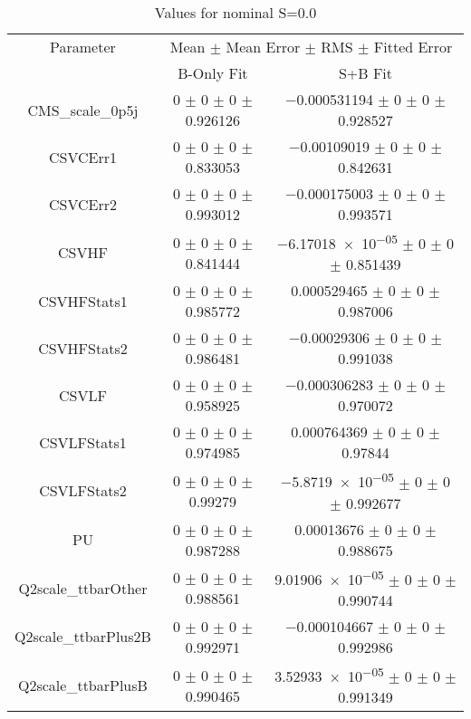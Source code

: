 \begin{table}
\centering
\caption{Values for nominal S=0.0}
\begin{tabular}{ccc}
\toprule
Parameter & \multicolumn{2}{c}{Mean $\pm$ Mean Error $\pm$ RMS $\pm$ Fitted Error}\\
 & B-Only Fit & S+B Fit\\
\midrule
CMS\_scale\_0p5j & \num{0} $\pm$ \num{0} $\pm$ \num{0} $\pm$ \num{0.926126} & \num{-0.000531194} $\pm$ \num{0} $\pm$ \num{0} $\pm$ \num{0.928527}\\
CSVCErr1 & \num{0} $\pm$ \num{0} $\pm$ \num{0} $\pm$ \num{0.833053} & \num{-0.00109019} $\pm$ \num{0} $\pm$ \num{0} $\pm$ \num{0.842631}\\
CSVCErr2 & \num{0} $\pm$ \num{0} $\pm$ \num{0} $\pm$ \num{0.993012} & \num{-0.000175003} $\pm$ \num{0} $\pm$ \num{0} $\pm$ \num{0.993571}\\
CSVHF & \num{0} $\pm$ \num{0} $\pm$ \num{0} $\pm$ \num{0.841444} & \num{-6.17018e-05} $\pm$ \num{0} $\pm$ \num{0} $\pm$ \num{0.851439}\\
CSVHFStats1 & \num{0} $\pm$ \num{0} $\pm$ \num{0} $\pm$ \num{0.985772} & \num{0.000529465} $\pm$ \num{0} $\pm$ \num{0} $\pm$ \num{0.987006}\\
CSVHFStats2 & \num{0} $\pm$ \num{0} $\pm$ \num{0} $\pm$ \num{0.986481} & \num{-0.00029306} $\pm$ \num{0} $\pm$ \num{0} $\pm$ \num{0.991038}\\
CSVLF & \num{0} $\pm$ \num{0} $\pm$ \num{0} $\pm$ \num{0.958925} & \num{-0.000306283} $\pm$ \num{0} $\pm$ \num{0} $\pm$ \num{0.970072}\\
CSVLFStats1 & \num{0} $\pm$ \num{0} $\pm$ \num{0} $\pm$ \num{0.974985} & \num{0.000764369} $\pm$ \num{0} $\pm$ \num{0} $\pm$ \num{0.97844}\\
CSVLFStats2 & \num{0} $\pm$ \num{0} $\pm$ \num{0} $\pm$ \num{0.99279} & \num{-5.8719e-05} $\pm$ \num{0} $\pm$ \num{0} $\pm$ \num{0.992677}\\
PU & \num{0} $\pm$ \num{0} $\pm$ \num{0} $\pm$ \num{0.987288} & \num{0.00013676} $\pm$ \num{0} $\pm$ \num{0} $\pm$ \num{0.988675}\\
Q2scale\_ttbarOther & \num{0} $\pm$ \num{0} $\pm$ \num{0} $\pm$ \num{0.988561} & \num{9.01906e-05} $\pm$ \num{0} $\pm$ \num{0} $\pm$ \num{0.990744}\\
Q2scale\_ttbarPlus2B & \num{0} $\pm$ \num{0} $\pm$ \num{0} $\pm$ \num{0.992971} & \num{-0.000104667} $\pm$ \num{0} $\pm$ \num{0} $\pm$ \num{0.992986}\\
Q2scale\_ttbarPlusB & \num{0} $\pm$ \num{0} $\pm$ \num{0} $\pm$ \num{0.990465} & \num{3.52933e-05} $\pm$ \num{0} $\pm$ \num{0} $\pm$ \num{0.991349}\\

\end{tabular}
\end{table}
